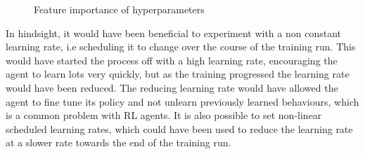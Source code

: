 \begin{figure}[!htb]
    \centering
    \caption{Feature importance of hyperparameters}\label{feature_importance}
\end{figure}


In hindsight, it would have been beneficial to experiment with a non constant learning rate, i.e scheduling it to change over the course of the training run. This would have started the process off with a high learning rate, encouraging the agent to learn lots very quickly, but as the training progressed the learning rate would have been reduced. The reducing learning rate would have allowed the agent to fine tune its policy and not unlearn previously learned behaviours, which is a common problem with RL agents. It is also possible to set non-linear scheduled learning rates, which could have been used to reduce the learning rate at a slower rate towards the end of the training run.  

